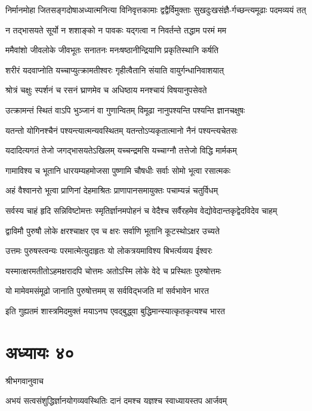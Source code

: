 \twolineshloka
{निर्मानमोहा जितसङ्गदोषाअध्यात्मनित्या विनिवृत्तकामाः}
{द्वद्वैर्विमुक्ताः सुखदुःखसंज्ञै-र्गच्छन्त्यमूढाः पदमव्ययं तत्}


\twolineshloka
{न तद्भासयते सूर्यो न शशाङ्को न पावकः}
{यद्गत्वा न निवर्तन्ते तद्धाम परमं मम}


\twolineshloka
{ममैवांशो जीवलोके जीवभूतः सनातनः}
{मनःषष्ठानीन्द्रियाणि प्रकृतिस्थानि कर्षति}


\twolineshloka
{शरीरं यदवाप्नोति यच्चाप्युत्क्रामतीश्वरः}
{गृहीत्वैतानि संयाति वायुर्गन्धानिवाशयात्}


\twolineshloka
{श्रोत्रं चक्षुः स्पर्शनं च रसनं घ्राणमेव च}
{अधिष्ठाय मनश्चायं विषयानुपसेवते}


\twolineshloka
{उत्क्रामन्तं स्थितं वाऽपि भुञ्जानं वा गुणान्वितम्}
{विमूढा नानुपश्यन्ति पश्यन्ति ज्ञानचक्षुषः}


\twolineshloka
{यतन्तो योगिनश्चैनं पश्यन्त्यात्मन्यवस्थितम्}
{यतन्तोऽप्यकृतात्मानो नैनं पश्यन्त्यचेतसः}


\twolineshloka
{यदादित्यगतं तेजो जगद्भासयतेऽखिलम्}
{यच्चन्द्रमसि यच्चाग्नौ तत्तेजो विद्धि मार्मकम्}


\twolineshloka
{गामाविश्य च भूतानि धारयम्यहमोजसा}
{पुष्णामि चौषधीः सर्वाः सोमो भूत्वा रसात्मकः}


\twolineshloka
{अहं वैश्वानरो भूत्वा प्राणिनां देहमाश्रितः}
{प्राणापानसमायुक्तः पचाम्यन्नं चतुर्विधम्}


\twolineshloka
{सर्वस्य चाहं हृदि सन्निविष्टोमत्तः स्मृतिर्ज्ञानमपोहनं च}
{वेदैश्च सर्वैरहमेव वेद्योवेदान्तकृद्वेदविदेव चाहम्}


\twolineshloka
{द्वाविमौ पुरुषौ लोके क्षरश्चाक्षर एव च}
{क्षरः सर्वाणि भूतानि कूटस्थोऽक्षर उच्यते}


\twolineshloka
{उत्तमः पुरुषस्त्वन्यः परमात्मेत्युदाहृतः}
{यो लोकत्रयमाविश्य बिभर्त्यव्यय ईश्वरः}


\twolineshloka
{यस्मात्क्षरमतीतोऽहमक्षरादपि चोत्तमः}
{अतोऽस्मि लोके वेदे च प्रस्थितः पुरुषोत्तमः}


\twolineshloka
{यो मामेवमसंमूढो जानाति पुरुषोत्तमम्}
{स सर्वविद्भजति मां सर्वभावेन भारत}


\twolineshloka
{इति गुह्यतमं शास्त्रमिदमुक्तं मयाऽनघ}
{एवद्बुद्ध्वा बुद्धिमान्स्यात्कृतकृत्यश्च भारत}


\chapter{अध्यायः ४०}
\twolineshloka
{श्रीभगवानुवाच}
{}


\twolineshloka
{अभयं सत्वसंशुद्धिर्ज्ञानयोगव्यवस्थितिः}
{दानं दमश्च यज्ञश्च स्वाध्यायस्तप आर्जवम्}


